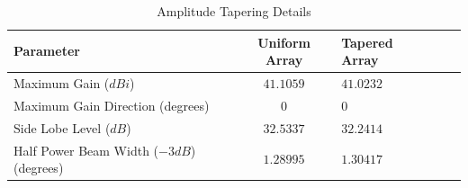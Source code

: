 \documentclass[11pt]{witseiepaper}
\begin{document}
\begin{bibunit}[witseie]
\begin{table}[htb]
    \caption{Amplitude Tapering Details}
    \label{tab:AmplitudeTapering}
    \begin{center}
        \begin{tabular}{p{60mm}cp{40mm}cp{40mm}}
            \hline 
            Parameter & Uniform Array & Tapered Array \\
            \hline
            Maximum Gain ($dBi$) & $41.1059$ & $41.0232$ \\
            Maximum Gain Direction (degrees) & $0$ & $0$ \\
            Side Lobe Level ($dB$) & $32.5337$ & $32.2414$ \\
            Half Power Beam Width ($-3 dB$) (degrees) & $1.28995$ & $1.30417$ \\
            \hline
        \end{tabular}
    \end{center}
\end{table}











\end{bibunit}
\end{document}
